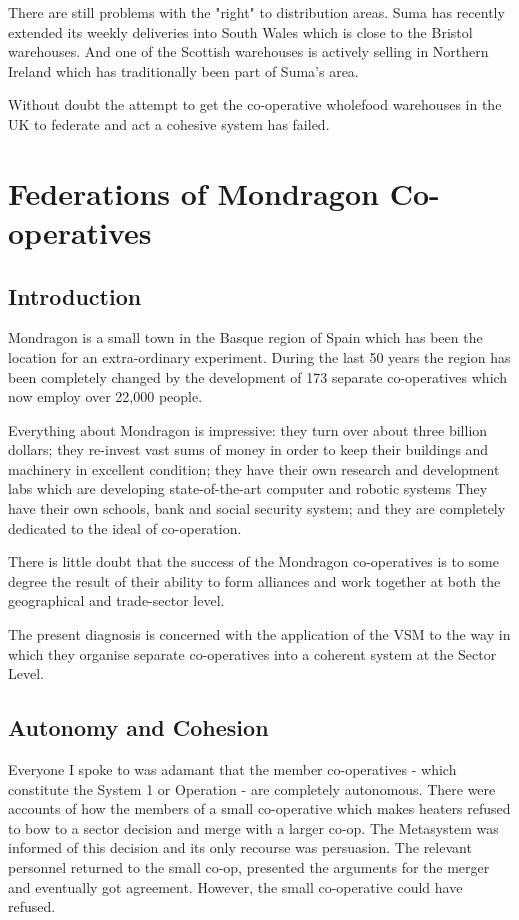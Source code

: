 There are still problems with the "right" to distribution areas. Suma has recently extended its weekly deliveries into South Wales which is close to the Bristol warehouses. And one of the Scottish warehouses is actively selling in Northern Ireland which has traditionally been part of Suma's area.

Without doubt the attempt to get the co-operative wholefood warehouses in the UK to federate and act a cohesive system has failed.

\section*{Federations of Mondragon Co-operatives}

\subsection*{Introduction}
Mondragon is a small town in the Basque region of Spain which has been the location for an extra-ordinary experiment. During the last 50 years the region has been completely changed by the development of 173 separate co-operatives which now employ over 22,000 people.

Everything about Mondragon is impressive: they turn over about three billion dollars; they re-invest vast sums of money in order to keep their buildings and machinery in excellent condition; they have their own research and development labs which are developing state-of-the-art computer and robotic systems They have their own schools, bank and social security system; and they are completely dedicated to the ideal of co-operation.

There is little doubt that the success of the Mondragon co-operatives is to some degree the result of their ability to form alliances and work together at both the geographical and trade-sector level.

The present diagnosis is concerned with the application of the VSM to the way in which they organise separate co-operatives into a coherent system at the Sector Level.

\subsection*{Autonomy and Cohesion}
Everyone I spoke to was adamant that the member co-operatives - which constitute the System 1 or Operation - are completely autonomous. There were accounts of how the members of a small co-operative which makes heaters refused to bow to a sector decision and merge with a larger co-op. The Metasystem was informed of this decision and its only recourse was persuasion. The relevant personnel returned to the small co-op, presented the arguments for the merger and eventually got agreement. However, the small co-operative could have refused.

